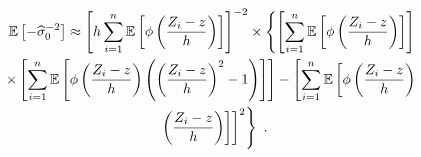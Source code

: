 \begin{multline}
  \operatorname{\mathbb{E}}\left[-\widehat{\sigma}_0^{-2}\right]
  \approx
  \left[
    h\sum_{i=1}^n
    \operatorname{\mathbb{E}}\left[\phi\left(
      \dfrac{
        Z_i-z
      }
      {
        h
      }
    \right)\right]
  \right]^{-2}
  \times
  \left\{
    \left[
      \sum_{i=1}^n
      \operatorname{\mathbb{E}}\left[
      \phi\left(
        \dfrac{
          Z_i-z
        }
        {
          h
        }
      \right)\right]
    \right]
  \right.
  \\
  \left.
    \times
    \left[
      \sum_{i=1}^n
      \operatorname{\mathbb{E}}\left[
      \phi\left(
        \dfrac{
          Z_i-z
        }
        {
          h
        }
      \right)
      \left(
        \left(
          \dfrac{
            Z_i-z
          }
          {
            h
          }
        \right)^2
        -1
      \right)
    \right]\right]
    -
    \left[
      \sum_{i=1}^n
      \operatorname{\mathbb{E}}\left[\phi\left(
        \dfrac{
          Z_i-z
        }
        {
          h
        }
      \right)
    \right.\right.
  \right.
  \\
  \left.
    \left.\left.
      \left(
        \dfrac{
          Z_i-z
        }
        {
          h
        }
      \right)\right]
    \right]^2
  \right\}
  \ .
  \label{eq:appendix_expectationNullStd}
\end{multline}

